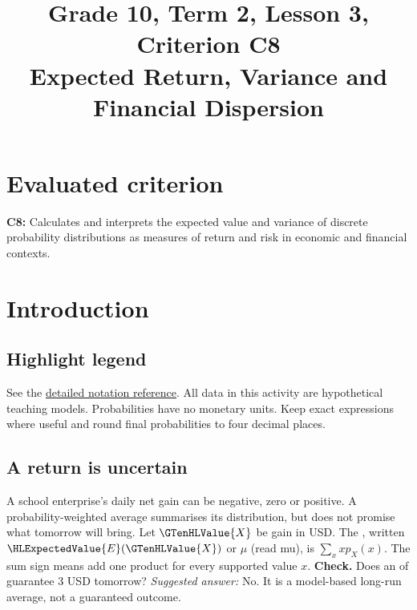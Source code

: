 \makeatletter
{}
\makeatother



\CoordinatedTermTwoPalette
\usepackage{needspace}
\setlength{\emergencystretch}{2em}
\title{Grade 10, Term 2, Lesson 3, Criterion C8\\Expected Return, Variance and Financial Dispersion}
\author{}
\date{}

\maketitle
\setcounter{tocdepth}{1}
\setcounter{secnumdepth}{2}
\label{toc}
\tableofcontents
\section*{Evaluated criterion}
\textbf{C8:} Calculates and interprets the expected value and variance of discrete probability distributions as measures of return and risk in economic and financial contexts.
\section{Introduction}\label{sec:t2-c8-introduction}
\subsection*{Highlight legend}
\label{tab:highlight-legend}
See the \hyperref[tab:notation-reference]{detailed notation reference}.
All data in this activity are hypothetical teaching models. Probabilities have no monetary units. Keep exact expressions where useful and round final probabilities to four decimal places.
\subsection{A return is uncertain}
A school enterprise's daily net gain can be negative, zero or positive. A probability-weighted average summarises its distribution, but does not promise what tomorrow will bring. Let $\GTenHLValue{X}$ be gain in USD. The , written $\HLExpectedValue{E}(\GTenHLValue{X})$ or $\mu$ (read mu), is $\sum_x xp_X(x)$. The sum sign means add one product for every supported value $x$.
\textbf{Check.} Does an  of  guarantee 3 USD tomorrow? \emph{Suggested answer:} No. It is a model-based long-run average, not a guaranteed outcome.


